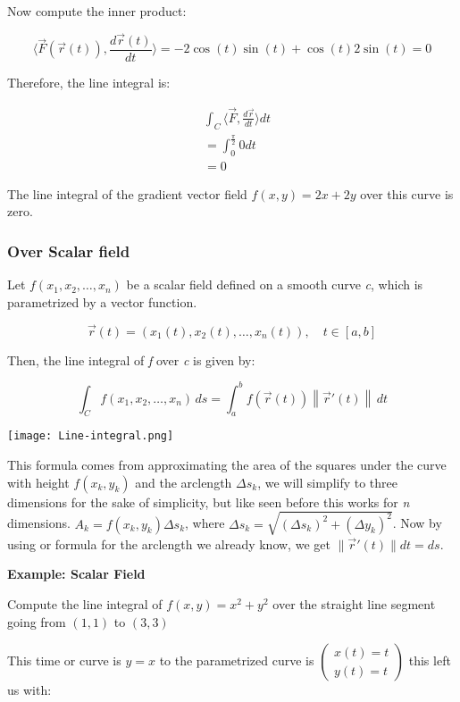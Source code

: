 Now compute the inner product:

\[
    \langle\vec{F}(\vec{r}(t)), \frac{d \vec{r}(t)}{dt}\rangle =
    -2\cos(t)\sin(t) + \cos(t)2\sin(t) = 0
\]

Therefore, the line integral is:

\begin{align*}
    &\int_C \langle \vec{F}, \frac{d\vec{r}}{dt}\rangle dt \\ 
    &= \int_0^{\frac{\pi}{2}}  0 dt \\
    &= 0
\end{align*}

The line integral of the gradient vector field \(f(x,y) = 2x + 2y \) over this curve is zero. 

\subsubsection{Over Scalar field}

Let \( f(x_1, x_2, \ldots, x_n) \) be a scalar field defined on a smooth curve \emph{c}, which 
is parametrized by a vector function.

\[
    \vec{r}(t) = (x_1(t), x_2(t), \ldots, x_n(t)), \quad t \in [a, b]
\]

Then, the line integral of \emph{f} over \emph{c} is given by:

\[
    \int_C f(x_1, x_2, \ldots, x_n) \, ds = \int_a^b f(\vec{r}(t)) \left\| \vec{r}'(t) \right\| \, dt
\]


\begin{center}
    \texttt{[image: Line-integral.png]}
\end{center}

This formula comes from approximating the area of the squares under the curve with height \(f(x_k, y_k)\) 
and the arclength \(\varDelta s_k\), we will simplify to three dimensions for the sake
of simplicity, but like seen before this works for \emph{n} dimensions. 
\(A_k = f(x_k, y_k) \varDelta s_k\), where 
\(\varDelta s_k = \sqrt{(\varDelta s_k)^2 + (\varDelta y_k)^2} \). Now by using or formula 
for the arclength we already know, we get \(\|\vec{r}' (t)\| dt = ds\). 

\textbf{Example: Scalar Field}
\vspace{\baselineskip}

Compute the line integral of \(f(x,y) = x^2 + y^2\) over the straight line segment going
from \((1,1)\) to \((3,3)\)

This time or curve is \(y = x\) to the parametrized curve is \(\begin{pmatrix}
    x(t) = t \\ y(t) = t
\end{pmatrix}\) this left us with:

